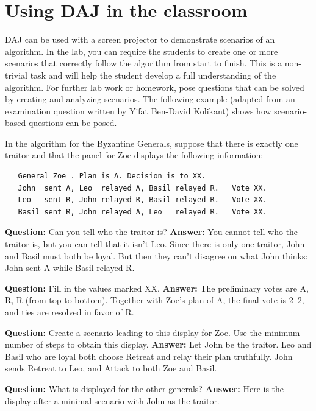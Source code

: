 \documentclass[11pt]{article}
\newcommand{\daj}{\textsc{DAJ}}
\begin{document}
\newpage

\section{Using \daj{} in the classroom}
\daj{} can be used with a screen projector
to demonstrate scenarios of an algorithm.
In the lab, you can require the students to create one or more
scenarios that correctly follow the algorithm from start to finish.
This is a non-trivial task and will help the student develop
a full understanding of the algorithm.
For further lab work or homework, pose questions that can
be solved by creating and analyzing scenarios.
The following example (adapted from an examination question
written by Yifat Ben-David Kolikant) shows how scenario-based
questions can be posed.

In the algorithm for the Byzantine Generals, suppose that
there is exactly one traitor and that the panel for Zoe displays
the following information:
\begin{verbatim}
   General Zoe . Plan is A. Decision is to XX.
   John  sent A, Leo  relayed A, Basil relayed R.   Vote XX.
   Leo   sent R, John relayed R, Basil relayed R.   Vote XX.
   Basil sent R, John relayed A, Leo   relayed R.   Vote XX.
\end{verbatim}
\textbf{Question:} Can you tell who the traitor is?
\textbf{Answer:} You cannot tell who the traitor is, but you can tell that
it isn't Leo. Since there is only one traitor, John and Basil
must both be loyal. But then they can't disagree on what John
thinks: John sent A while Basil relayed R.

\textbf{Question:} Fill in the
values marked XX. \textbf{Answer:} The preliminary votes are A, R, R
(from top to bottom). Together with Zoe's plan of A, the final
vote is 2--2, and ties are resolved in favor of R.

\textbf{Question:} Create
a scenario leading to this display for Zoe. Use the minimum
number of steps to obtain this display. \textbf{Answer:} Let John be the
traitor. Leo and Basil who are loyal both choose Retreat and
relay their plan truthfully. John sends Retreat to Leo, and
Attack to both Zoe and Basil.

\textbf{Question:} What is displayed for the
other generals? \textbf{Answer:} Here is the display after a minimal
scenario with John as the traitor.
\end{document}
